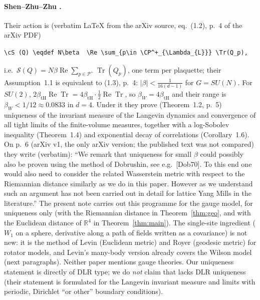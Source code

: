 \documentclass[11pt,a4paper]{article}
\theoremstyle{remark}
\theoremstyle{definition}
\theoremstyle{plain}
\theoremstyle{remark}
\newcommand{\R}{\mathbb{R}}
\newcommand{\ReTr}{\operatorname{Re}\operatorname{Tr}}
\begin{document}
\paragraph{Shen--Zhu--Zhu \cite{SZZ23}.} Their action is (verbatim LaTeX from the arXiv source, eq.~(1.2),
p.~4 of the arXiv PDF)
\begin{center}\small\verb|\cS (Q) \eqdef N\beta  \Re \sum_{p\in \CP^+_{\Lambda_{L}}} \Tr(Q_p),|\end{center}
i.e.\ $\mathcal S(Q)=N\beta\operatorname{Re}\sum_{p\in\mathcal P^+}\operatorname{Tr}(Q_p)$, one term per plaquette; their
Assumption~1.1 is equivalent to (1.3), p.~4: $|\beta|<\frac{1}{16(d-1)}$ for $G=SU(N)$. For $SU(2)$,
$2\beta_{\mathrm{tH}}\ReTr=4\beta_{\mathrm{tH}}\cdot\frac12\ReTr$, so $\beta_W=4\beta_{\mathrm{tH}}$ and their range is
$\beta_W<1/12\approx0.0833$ in $d=4$. Under it they prove (Theorem~1.2, p.~5) uniqueness of the invariant
measure of the Langevin dynamics and convergence of all tight limits of the finite-volume measures, together
with a log-Sobolev inequality (Theorem~1.4) and exponential decay of correlations (Corollary~1.6).
On p.~6 (arXiv v1, the only arXiv version; the published text was not compared) they write (verbatim): ``We remark that uniqueness for small $\beta$ could possibly also be proven
using the method of Dobrushin, see e.g.\ [Dob70]. To this end one would also need to consider the related
Wasserstein metric with respect to the Riemannian distance similarly as we do in this paper. However as we
understand such an argument has not been carried out in detail for lattice Yang Mills in the literature.''
The present note carries out this programme for the gauge model, for uniqueness only (with the Riemannian
distance in Theorem~\ref{thm:geo}, and with the Euclidean distance of $\R^4$ in Theorem~\ref{thm:main}). The
single-site ingredient ($W_1$ on a sphere, derivative along a path of fields written as a covariance) is not
new: it is the method of Levin \cite{Lev80} (Euclidean metric) and Royer \cite{Roy86} (geodesic metric) for
rotator models, and Levin's many-body version already covers the Wilson model (next paragraphs). Neither paper
mentions gauge theories.
Our uniqueness statement is directly of DLR type; we do \emph{not} claim that \cite{SZZ23} lacks DLR
uniqueness (their statement is formulated for the Langevin invariant measure and limits with periodic,
Dirichlet ``or other'' boundary conditions).
\end{document}
